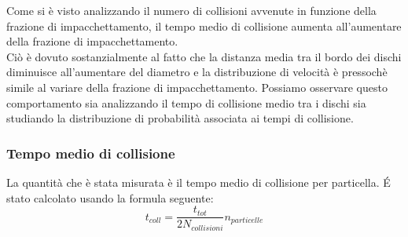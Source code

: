Come si è visto analizzando il numero di collisioni avvenute in funzione della frazione di impacchettamento, il tempo medio di collisione aumenta all'aumentare della frazione di impacchettamento.\\
Ciò è dovuto sostanzialmente al fatto che la distanza media tra il bordo dei dischi diminuisce all'aumentare del diametro e la distribuzione di velocità è pressochè simile al variare della frazione di impacchettamento.
Possiamo osservare questo comportamento sia analizzando il tempo di collisione medio tra i dischi sia studiando la distribuzione di probabilità associata ai tempi di collisione.\\

\subsubsection*{Tempo medio di collisione}
La quantità che è stata misurata è il tempo medio di collisione per particella. \'E stato calcolato usando la formula seguente:
$$
	t_{coll}  = \frac{t_{tot}}{2 N_{collisioni}} n_{particelle}
$$

